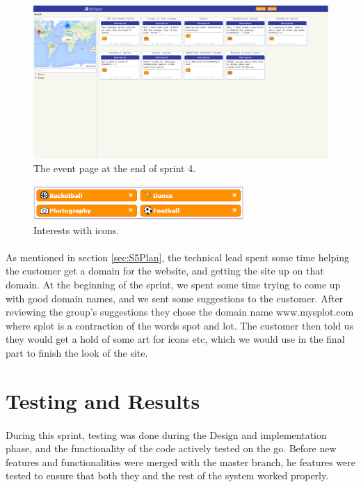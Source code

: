 \begin{figure}[ht!]
  \centering
  \includegraphics[width=\linewidth]{./img/webpage/3Nov/FrontpageEvents}
  \caption{The event page at the end of sprint 4.}
  \label{fig:S5DesignImplFrontEvents3Nov}
\end{figure}

\begin{figure}[ht!]
  \centering
  \includegraphics[width=80mm]{./Sprint5/img/InterestIcons}
  \caption{Interests with icons.}
  \label{fig:S5DesignImplInterestIcons}
\end{figure}

\paragraph{} As mentioned in section \ref{sec:S5Plan}, the technical lead spent some time helping the customer get a domain for the website, and getting the site up on that domain. At the beginning of the sprint, we spent some time trying to come up with good domain names, and we sent some suggestions to the customer. After reviewing the group's suggestions they chose the domain name www.mysplot.com where splot is a contraction of the words spot and lot. The customer then told us they would get a hold of some art for icons etc, which we would use in the final part to finish the look of the site.


\section{Testing and Results}
\label{sec:S5Testing}
\paragraph{} During this sprint, testing was done during the Design and implementation phase, and the functionality of the code actively tested on the go. Before new features and functionalities were merged with the master branch, he features were tested to ensure that both they and the rest of the system worked properly. 

